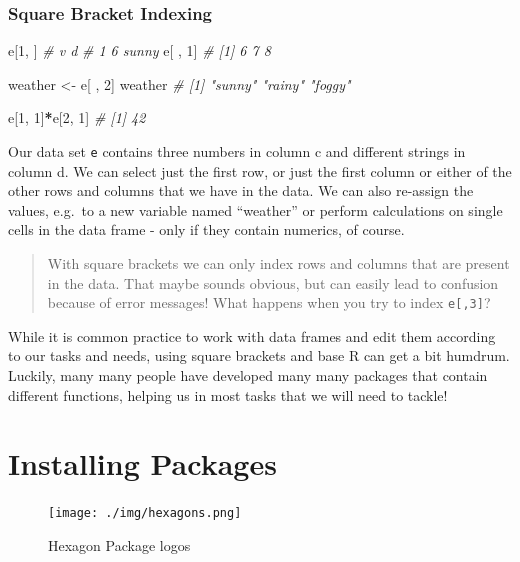 \documentclass[
]{book}
\newenvironment{Shaded}{\begin{snugshade}}{\end{snugshade}}
\newcommand{\CommentTok}[1]{\textcolor[rgb]{0.56,0.35,0.01}{\textit{#1}}}
\newcommand{\DecValTok}[1]{\textcolor[rgb]{0.00,0.00,0.81}{#1}}
\newcommand{\NormalTok}[1]{#1}
\newcommand{\OtherTok}[1]{\textcolor[rgb]{0.56,0.35,0.01}{#1}}
\newcommand{\SpecialCharTok}[1]{\textcolor[rgb]{0.81,0.36,0.00}{\textbf{#1}}}
\begin{document}
\subsubsection*{Square Bracket Indexing}\label{square-bracket-indexing}

\begin{Shaded}
\begin{Highlighting}[]
\NormalTok{e[}\DecValTok{1}\NormalTok{, ]}
\CommentTok{\#   v     d}
\CommentTok{\# 1 6 sunny}
\NormalTok{e[ , }\DecValTok{1}\NormalTok{]}
\CommentTok{\# [1] 6 7 8}

\NormalTok{weather }\OtherTok{\textless{}{-}}\NormalTok{ e[ , }\DecValTok{2}\NormalTok{]}
\NormalTok{weather}
\CommentTok{\# [1] "sunny" "rainy" "foggy"}

\NormalTok{e[}\DecValTok{1}\NormalTok{, }\DecValTok{1}\NormalTok{]}\SpecialCharTok{*}\NormalTok{e[}\DecValTok{2}\NormalTok{, }\DecValTok{1}\NormalTok{]}
\CommentTok{\# [1] 42}
\end{Highlighting}
\end{Shaded}

Our data set \texttt{e} contains three numbers in column c and different strings in column d.
We can select just the first row, or just the first column or either of the other rows and columns that we have in the data.
We can also re-assign the values, e.g.~to a new variable named ``weather'' or perform calculations on single cells in the data frame - only if they contain numerics, of course.

\begin{quote}
With square brackets we can only index rows and columns that are present in the data.
That maybe sounds obvious, but can easily lead to confusion because of error messages!
What happens when you try to index \texttt{e{[},3{]}}?
\end{quote}

While it is common practice to work with data frames and edit them according to our tasks and needs, using square brackets and base R can get a bit humdrum.
Luckily, many many people have developed many many packages that contain different functions, helping us in most tasks that we will need to tackle!

\section{Installing Packages}\label{installing-packages}

\begin{figure}
\centering
\texttt{[image: ./img/hexagons.png]}
\caption{Hexagon Package logos}
\end{figure}
\end{document}
